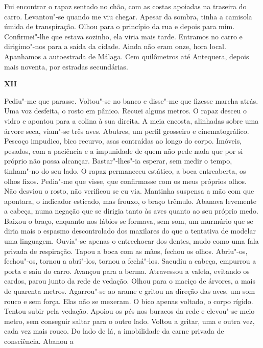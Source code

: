 Fui encontrar o rapaz sentado no chão, com as costas apoiadas na
traseira do carro. Levantou"-se quando me viu chegar. Apesar da sombra,
tinha a camisola úmida de transpiração. Olhou para o princípio da rua e
depois para mim. Confirmei"-lhe que estava sozinho, ela viria mais
tarde. Entramos no carro e dirigimo"-nos para a saída da cidade. Ainda
não eram onze, hora local. Apanhamos a autoestrada de Málaga. Cem
quilômetros até Antequera, depois mais noventa, por estradas
secundárias.

\vspace*{1.8cm}
\noindent{}\textbf{XII}

\bigskip

Pediu"-me que parasse. Voltou"-se no banco e disse"-me que fizesse
marcha atrás. Uma voz desfeita, o rosto em pânico. Recuei alguns metros.
O rapaz desceu o vidro e apontou para a colina à sua direita. A meia
encosta, alinhadas sobre uma árvore seca, viam"-se três aves. Abutres,
um perfil grosseiro e cinematográfico. Pescoço impudico, bico recurvo,
asas contraídas ao longo do corpo. Imóveis, pesados, com a paciência e a
impunidade de quem não pede nada que por si próprio não possa alcançar.
Bastar"-lhes"-ia esperar, sem medir o tempo, tinham"-no do seu lado. O
rapaz permaneceu estático, a boca entreaberta, os olhos fixos. Pedia"-me
que visse, que confirmasse com os meus próprios olhos. Não desviou o
rosto, não verificou se eu via. Mantinha suspensa a mão com que
apontara, o indicador esticado, mas frouxo, o braço trêmulo. Abanava
levemente a cabeça, numa negação que se dirigia tanto às aves quanto ao
seu próprio medo. Baixou o braço, enquanto nos lábios se formava, sem
som, um murmúrio que se diria mais o espasmo descontrolado dos maxilares
do que a tentativa de modelar uma linguagem. Ouvia"-se apenas o
entrechocar dos dentes, mudo como uma fala privada de respiração. Tapou
a boca com as mãos, fechou os olhos. Abriu"-os, fechou"-os, tornou a
abri"-los, tornou a fechá"-los. Sacudiu a cabeça, empurrou a porta e
saiu do carro. Avançou para a berma. Atravessou a valeta, evitando os
cardos, parou junto da rede de vedação. Olhou para o maciço de árvores,
a mais de quarenta metros. Agarrou"-se ao arame e gritou na direção das
aves, um som rouco e sem força. Elas não se mexeram. O bico apenas
voltado, o corpo rígido. Tentou subir pela vedação. Apoiou os pés nos
buracos da rede e elevou"-se meio metro, sem conseguir saltar para o
outro lado. Voltou a gritar, uma e outra vez, cada vez mais rouco. Do
lado de lá, a imobilidade da carne privada de consciência. Abanou a
